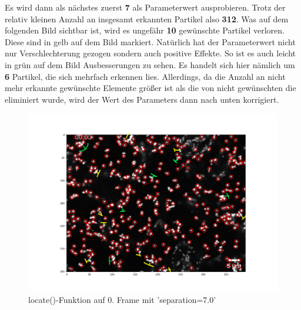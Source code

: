 \begin{enumerate}
Es wird dann als nächstes zuerst \textbf{7} als Parameterwert ausprobieren. Trotz der relativ kleinen Anzahl an insgesamt erkannten Partikel also \textbf{312}. Was auf dem folgenden Bild sichtbar ist, wird es ungefähr \textbf{10} gewünschte Partikel verloren. Diese sind in gelb auf dem Bild markiert. Natürlich hat der Parameterwert nicht nur Verschlechterung gezogen sondern auch positive Effekte. So ist es auch leicht in grün auf dem Bild Ausbesserungen zu sehen. Es handelt sich hier nämlich um \textbf{6} Partikel, die sich mehrfach erkennen lies. 
Allerdings, da die Anzahl an nicht mehr erkannte gewünschte Elemente größer ist als die von nicht gewünschten die eliminiert wurde, wird der Wert des Parameters dann nach unten korrigiert.
\begin{figure}[H]
    \centering
    \includegraphics[scale=0.35]{Grafiken/trackpyBilder/locate_with_separation_(7).png}
    \caption{locate()-Funktion auf 0. Frame mit 'separation=7.0'}
    \label{fig:kap3_sep=7}
\end{figure}


\end{enumerate}
